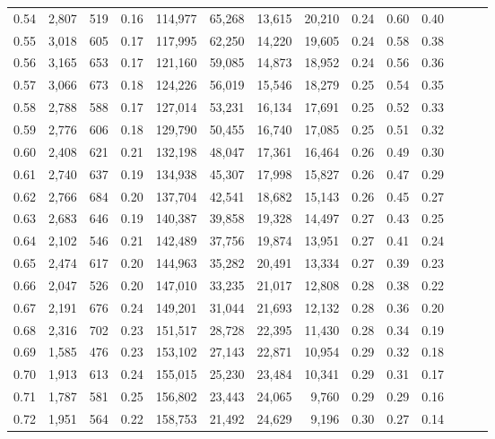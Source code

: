 \begin{tabular}{rrrrrrrrrrrrrr}
0.54 &  2,807 &  519 &  0.16 &  114,977 &   65,268 &  13,615 &  20,210 &  0.24 &  0.60 &      0.40 \\
0.55 &  3,018 &  605 &  0.17 &  117,995 &   62,250 &  14,220 &  19,605 &  0.24 &  0.58 &      0.38 \\
0.56 &  3,165 &  653 &  0.17 &  121,160 &   59,085 &  14,873 &  18,952 &  0.24 &  0.56 &      0.36 \\
0.57 &  3,066 &  673 &  0.18 &  124,226 &   56,019 &  15,546 &  18,279 &  0.25 &  0.54 &      0.35 \\
0.58 &  2,788 &  588 &  0.17 &  127,014 &   53,231 &  16,134 &  17,691 &  0.25 &  0.52 &      0.33 \\
0.59 &  2,776 &  606 &  0.18 &  129,790 &   50,455 &  16,740 &  17,085 &  0.25 &  0.51 &      0.32 \\
0.60 &  2,408 &  621 &  0.21 &  132,198 &   48,047 &  17,361 &  16,464 &  0.26 &  0.49 &      0.30 \\
0.61 &  2,740 &  637 &  0.19 &  134,938 &   45,307 &  17,998 &  15,827 &  0.26 &  0.47 &      0.29 \\
0.62 &  2,766 &  684 &  0.20 &  137,704 &   42,541 &  18,682 &  15,143 &  0.26 &  0.45 &      0.27 \\
0.63 &  2,683 &  646 &  0.19 &  140,387 &   39,858 &  19,328 &  14,497 &  0.27 &  0.43 &      0.25 \\
0.64 &  2,102 &  546 &  0.21 &  142,489 &   37,756 &  19,874 &  13,951 &  0.27 &  0.41 &      0.24 \\
0.65 &  2,474 &  617 &  0.20 &  144,963 &   35,282 &  20,491 &  13,334 &  0.27 &  0.39 &      0.23 \\
0.66 &  2,047 &  526 &  0.20 &  147,010 &   33,235 &  21,017 &  12,808 &  0.28 &  0.38 &      0.22 \\
0.67 &  2,191 &  676 &  0.24 &  149,201 &   31,044 &  21,693 &  12,132 &  0.28 &  0.36 &      0.20 \\
0.68 &  2,316 &  702 &  0.23 &  151,517 &   28,728 &  22,395 &  11,430 &  0.28 &  0.34 &      0.19 \\
0.69 &  1,585 &  476 &  0.23 &  153,102 &   27,143 &  22,871 &  10,954 &  0.29 &  0.32 &      0.18 \\
0.70 &  1,913 &  613 &  0.24 &  155,015 &   25,230 &  23,484 &  10,341 &  0.29 &  0.31 &      0.17 \\
0.71 &  1,787 &  581 &  0.25 &  156,802 &   23,443 &  24,065 &   9,760 &  0.29 &  0.29 &      0.16 \\
0.72 &  1,951 &  564 &  0.22 &  158,753 &   21,492 &  24,629 &   9,196 &  0.30 &  0.27 &      0.14 \\

\end{tabular}
